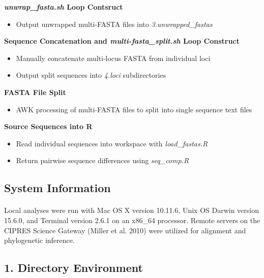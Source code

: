 \begin{seqlist}
\item{\textbf{\textit{unwrap\_fasta.sh} Loop Contsruct}}
\begin{itemize}
\item{Output unwrapped multi-FASTA files into \textit{3.unwrapped\_fastas}}
\end{itemize}

\item{\textbf{Sequence Concatenation and \textit{multi-fasta\_split.sh} Loop Construct}}
\begin{itemize}
\item{Manually concatenate multi-locus FASTA from individual loci}
\item{Output split sequences into \textit{4.loci} subdirectories}
\end{itemize}

\clearpage

\item{\textbf{FASTA File Split}}
\begin{itemize}
\item{AWK processing of multi-FASTA files to split into single sequence text files}
\end{itemize}

\item{\textbf{Source Sequences into R}}
\begin{itemize}
\item{Read individual sequences into workspace with \textit{load\_fastas.R}}
\item{Return pairwise sequence differences using \textit{seq\_comp.R}}
\end{itemize}

\end{seqlist}

\subsection*{System Information}

\paragraph{} Local analyses were run with Mac OS X version 10.11.6, Unix OS Darwin version 15.6.0, and Terminal version 2.6.1 on an x86\_64 processor.  Remote servers on the CIPRES Science Gateway (Miller et al. 2010) were utilized for alignment and phylogenetic inference.  

\subsection*{1. Directory Environment}

